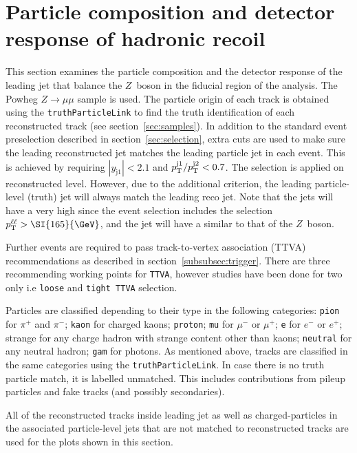 \section{Particle composition and detector response of hadronic recoil}

This section examines the particle composition and the detector response of the leading jet that balance the $Z$~boson in the fiducial region of the analysis.
The Powheg $Z\to \mu\mu$ sample is used. The particle origin of each track is obtained using the \texttt{truthParticleLink} to find the truth identification of each reconstructed track (see section~\ref{sec:samples}). In addition to the standard event preselection described in section~\ref{sec:selection}, extra cuts are used to make sure the leading reconstructed jet matches the leading particle jet in each event.
This is achieved by requiring $|y_\mathrm{j1}|<2.1$ and $p_\mathrm{T}^{\mathrm{j1}} / p_\mathrm{T}^{\mathrm{j2}} < 0.7$. The selection is applied on reconstructed level. However, due to the additional criterion, the leading particle-level (truth) jet will always match the leading reco jet. Note that the jets will have a very high \pt{} since the event selection includes the selection $\pTll > \SI{165}{\GeV}$, and the jet will have a similar \pt{} to that of the $Z$~boson. 

Further events are required to pass track-to-vertex association (TTVA) recommendations as described in section~\ref{subsubsec:trigger}. There are three recommending working points for \texttt{TTVA}, however studies have been done for two only i.e \texttt{loose} and \texttt{tight TTVA} selection.  

Particles are classified depending to their type in the following categories: \texttt{pion} for $\pi^+$ and $\pi^-$; \texttt{kaon} for charged kaons; \texttt{proton};
\texttt{mu} for $\mu^-$ or $\mu^+$; \texttt{e} for $e^-$ or $e^+$;
strange for any charge hadron with strange content other than kaons; \texttt{neutral} for any neutral hadron; \texttt{gam} for photons. As mentioned above, tracks are classified in the same categories using the \texttt{truthParticleLink}. In case there is no truth particle match, it is labelled unmatched. This includes contributions from pileup particles and fake tracks (and possibly secondaries).

All of the reconstructed tracks inside leading jet as well as charged-particles in the associated particle-level jets that are not matched to reconstructed tracks are used for the plots shown in this section. 

